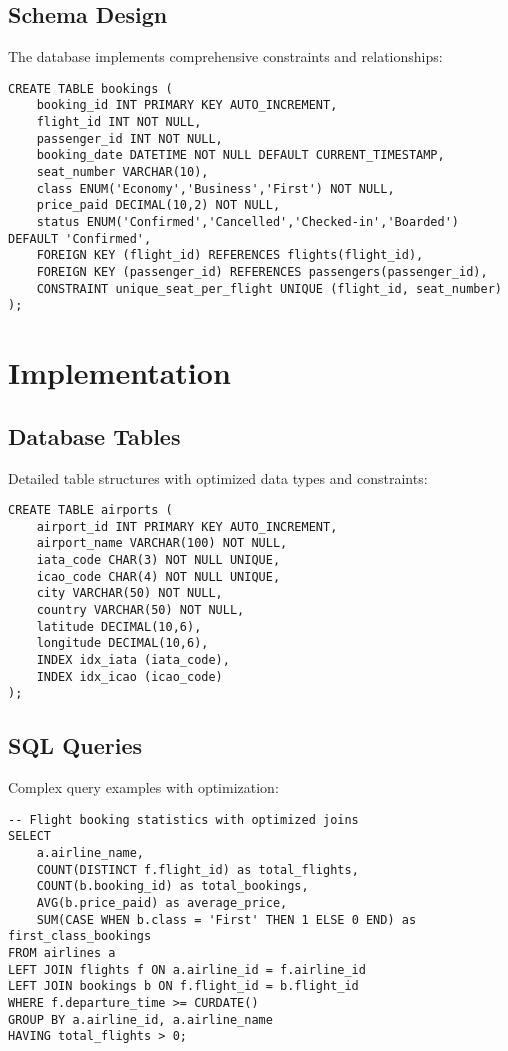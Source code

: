 \documentclass[a4paper,12pt]{article}
\begin{document}
\subsection{Schema Design}
The database implements comprehensive constraints and relationships:

\begin{lstlisting}[caption=Example of Complex Constraints]
CREATE TABLE bookings (
    booking_id INT PRIMARY KEY AUTO_INCREMENT,
    flight_id INT NOT NULL,
    passenger_id INT NOT NULL,
    booking_date DATETIME NOT NULL DEFAULT CURRENT_TIMESTAMP,
    seat_number VARCHAR(10),
    class ENUM('Economy','Business','First') NOT NULL,
    price_paid DECIMAL(10,2) NOT NULL,
    status ENUM('Confirmed','Cancelled','Checked-in','Boarded') DEFAULT 'Confirmed',
    FOREIGN KEY (flight_id) REFERENCES flights(flight_id),
    FOREIGN KEY (passenger_id) REFERENCES passengers(passenger_id),
    CONSTRAINT unique_seat_per_flight UNIQUE (flight_id, seat_number)
);
\end{lstlisting}

\section{Implementation}
\subsection{Database Tables}
Detailed table structures with optimized data types and constraints:

\begin{lstlisting}[caption=Optimized Table Structure]
CREATE TABLE airports (
    airport_id INT PRIMARY KEY AUTO_INCREMENT,
    airport_name VARCHAR(100) NOT NULL,
    iata_code CHAR(3) NOT NULL UNIQUE,
    icao_code CHAR(4) NOT NULL UNIQUE,
    city VARCHAR(50) NOT NULL,
    country VARCHAR(50) NOT NULL,
    latitude DECIMAL(10,6),
    longitude DECIMAL(10,6),
    INDEX idx_iata (iata_code),
    INDEX idx_icao (icao_code)
);
\end{lstlisting}

\subsection{SQL Queries}
Complex query examples with optimization:

\begin{lstlisting}[caption=Optimized Complex Query]
-- Flight booking statistics with optimized joins
SELECT 
    a.airline_name,
    COUNT(DISTINCT f.flight_id) as total_flights,
    COUNT(b.booking_id) as total_bookings,
    AVG(b.price_paid) as average_price,
    SUM(CASE WHEN b.class = 'First' THEN 1 ELSE 0 END) as first_class_bookings
FROM airlines a
LEFT JOIN flights f ON a.airline_id = f.airline_id
LEFT JOIN bookings b ON f.flight_id = b.flight_id
WHERE f.departure_time >= CURDATE()
GROUP BY a.airline_id, a.airline_name
HAVING total_flights > 0;
\end{lstlisting}
\end{document}
